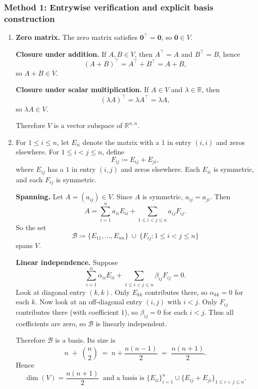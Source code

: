 \documentclass[12pt]{article}
\newcommand{\R}{\mathbb{R}}
\begin{document}
\subsubsection{Method 1: Entrywise verification and explicit basis construction}
\begin{enumerate}[label=(\alph*)]
\item \textbf{Zero matrix.} The zero matrix satisfies \(\mathbf{0}^\top=\mathbf{0}\), so \(\mathbf{0}\in V\).

\textbf{Closure under addition.} If \(A,B\in V\), then \(A^\top=A\) and \(B^\top=B\), hence
\[
(A+B)^\top = A^\top + B^\top = A+B,
\]
so \(A+B\in V\).

\textbf{Closure under scalar multiplication.} If \(A\in V\) and \(\lambda\in\R\), then
\[
(\lambda A)^\top = \lambda A^\top = \lambda A,
\]
so \(\lambda A\in V\).

Therefore \(V\) is a vector subspace of \(\R^{n,n}\).

\item For \(1\le i\le n\), let \(E_{ii}\) denote the matrix with a \(1\) in entry \((i,i)\) and zeros elsewhere.
For \(1\le i<j\le n\), define
\[
F_{ij}\coloneqq E_{ij}+E_{ji},
\]
where \(E_{ij}\) has a \(1\) in entry \((i,j)\) and zeros elsewhere.
Each \(E_{ii}\) is symmetric, and each \(F_{ij}\) is symmetric.

\textbf{Spanning.} Let \(A=(a_{ij})\in V\).
Since \(A\) is symmetric, \(a_{ij}=a_{ji}\).
Then
\[
A=\sum_{i=1}^n a_{ii}E_{ii}+\sum_{1\le i<j\le n} a_{ij}F_{ij}.
\]
So the set
\[
\mathcal{B}\coloneqq \{E_{11},\ldots,E_{nn}\}\ \cup\ \{F_{ij}:1\le i<j\le n\}
\]
spans \(V\).

\textbf{Linear independence.}
Suppose
\[
\sum_{i=1}^n \alpha_{ii}E_{ii}+\sum_{1\le i<j\le n}\beta_{ij}F_{ij}=0.
\]
Look at diagonal entry \((k,k)\). Only \(E_{kk}\) contributes there, so \(\alpha_{kk}=0\) for each \(k\).
Now look at an off-diagonal entry \((i,j)\) with \(i<j\). Only \(F_{ij}\) contributes there (with coefficient \(1\)), so \(\beta_{ij}=0\) for each \(i<j\).
Thus all coefficients are zero, so \(\mathcal{B}\) is linearly independent.

Therefore \(\mathcal{B}\) is a basis.
Its size is
\[
n \;+\; \binom{n}{2} \;=\; n+\frac{n(n-1)}{2} \;=\; \frac{n(n+1)}{2}.
\]
Hence
\[
\boxed{\,\dim(V)=\frac{n(n+1)}{2}\ \text{ and a basis is }\{E_{ii}\}_{i=1}^n\cup\{E_{ij}+E_{ji}\}_{1\le i<j\le n}.\,}
\]
\end{enumerate}
\end{document}
